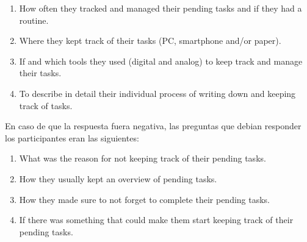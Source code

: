 \begin{enumerate}
    \item How often they tracked and managed their pending tasks and if they had a routine.
    \item Where they kept track of their tasks (PC, smartphone and/or paper).
    \item If and which tools they used (digital and analog) to keep track and manage their tasks.
    \item To describe in detail their individual process of writing down and keeping track of tasks.
\end{enumerate}

En caso de que la respuesta fuera negativa, las preguntas que debian responder los participantes eran las siguientes:

\begin{enumerate}
    \item What was the reason for not keeping track of their pending tasks.
    \item How they usually kept an overview of pending tasks.
    \item How they made sure to not forget to complete their pending tasks.
    \item If there was something that could make them start keeping track of their pending tasks.
\end{enumerate}

